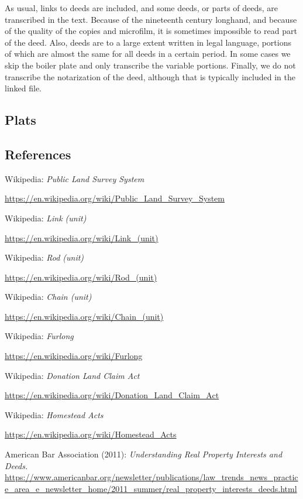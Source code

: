 \documentclass[
  12pt,
]{book}
\begin{document}
As usual, links to deeds are included, and some deeds, or parts of deeds, are transcribed in the text. Because of the nineteenth century longhand, and because of the quality of the copies and microfilm, it is sometimes impossible to read part of the deed. Also, deeds are to a large extent written in legal language, portions of which are almost the same for all deeds in a certain period. In some cases we skip the boiler plate and only transcribe the variable portions. Finally, we do not transcribe the notarization of the deed, although that is typically included in the linked file.

\hypertarget{plats}{%
\subsection{Plats}\label{plats}}

\hypertarget{references-2}{%
\subsection{References}\label{references-2}}

Wikipedia: \emph{Public Land Survey System}

\url{https://en.wikipedia.org/wiki/Public_Land_Survey_System}

Wikipedia: \emph{Link (unit) }

\url{https://en.wikipedia.org/wiki/Link_(unit)}

Wikipedia: \emph{Rod (unit) }

\url{https://en.wikipedia.org/wiki/Rod_(unit)}

Wikipedia: \emph{Chain (unit) }

\url{https://en.wikipedia.org/wiki/Chain_(unit)}

Wikipedia: \emph{Furlong }

\url{https://en.wikipedia.org/wiki/Furlong}

Wikipedia: \emph{Donation Land Claim Act}

\url{https://en.wikipedia.org/wiki/Donation_Land_Claim_Act}

Wikipedia: \emph{Homestead Acts }

\url{https://en.wikipedia.org/wiki/Homestead_Acts}

American Bar Association (2011): \emph{Understanding Real Property Interests and Deeds. }\url{https://www.americanbar.org/newsletter/publications/law_trends_news_practice_area_e_newsletter_home/2011_summer/real_property_interests_deeds.html}
\end{document}
